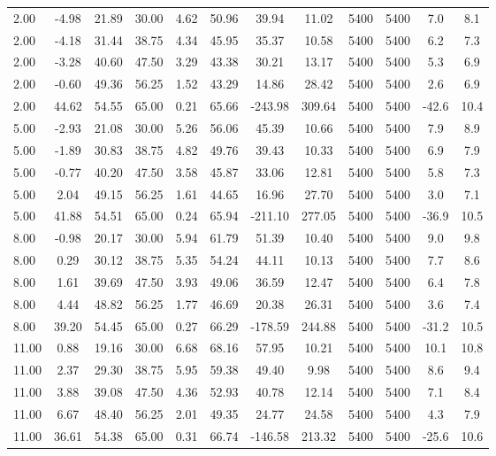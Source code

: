 \documentclass[english]{SPFShortReport}
\begin{document}
\begin{table}[!ht]
\begin{small}
\begin{center}
{\begin{tabular}{l | c c c c c c c c c c c }
2.00 & -4.98 & 21.89 & 30.00 & 4.62 & 50.96 & 39.94 & 11.02 & 5400 & 5400 & 7.0 & 8.1\\ 
2.00 & -4.18 & 31.44 & 38.75 & 4.34 & 45.95 & 35.37 & 10.58 & 5400 & 5400 & 6.2 & 7.3\\ 
2.00 & -3.28 & 40.60 & 47.50 & 3.29 & 43.38 & 30.21 & 13.17 & 5400 & 5400 & 5.3 & 6.9\\ 
2.00 & -0.60 & 49.36 & 56.25 & 1.52 & 43.29 & 14.86 & 28.42 & 5400 & 5400 & 2.6 & 6.9\\ 
2.00 & 44.62 & 54.55 & 65.00 & 0.21 & 65.66 & -243.98 & 309.64 & 5400 & 5400 & -42.6 & 10.4\\ 
5.00 & -2.93 & 21.08 & 30.00 & 5.26 & 56.06 & 45.39 & 10.66 & 5400 & 5400 & 7.9 & 8.9\\ 
5.00 & -1.89 & 30.83 & 38.75 & 4.82 & 49.76 & 39.43 & 10.33 & 5400 & 5400 & 6.9 & 7.9\\ 
5.00 & -0.77 & 40.20 & 47.50 & 3.58 & 45.87 & 33.06 & 12.81 & 5400 & 5400 & 5.8 & 7.3\\ 
5.00 & 2.04 & 49.15 & 56.25 & 1.61 & 44.65 & 16.96 & 27.70 & 5400 & 5400 & 3.0 & 7.1\\ 
5.00 & 41.88 & 54.51 & 65.00 & 0.24 & 65.94 & -211.10 & 277.05 & 5400 & 5400 & -36.9 & 10.5\\ 
8.00 & -0.98 & 20.17 & 30.00 & 5.94 & 61.79 & 51.39 & 10.40 & 5400 & 5400 & 9.0 & 9.8\\ 
8.00 & 0.29 & 30.12 & 38.75 & 5.35 & 54.24 & 44.11 & 10.13 & 5400 & 5400 & 7.7 & 8.6\\ 
8.00 & 1.61 & 39.69 & 47.50 & 3.93 & 49.06 & 36.59 & 12.47 & 5400 & 5400 & 6.4 & 7.8\\ 
8.00 & 4.44 & 48.82 & 56.25 & 1.77 & 46.69 & 20.38 & 26.31 & 5400 & 5400 & 3.6 & 7.4\\ 
8.00 & 39.20 & 54.45 & 65.00 & 0.27 & 66.29 & -178.59 & 244.88 & 5400 & 5400 & -31.2 & 10.5\\ 
11.00 & 0.88 & 19.16 & 30.00 & 6.68 & 68.16 & 57.95 & 10.21 & 5400 & 5400 & 10.1 & 10.8\\ 
11.00 & 2.37 & 29.30 & 38.75 & 5.95 & 59.38 & 49.40 & 9.98 & 5400 & 5400 & 8.6 & 9.4\\ 
11.00 & 3.88 & 39.08 & 47.50 & 4.36 & 52.93 & 40.78 & 12.14 & 5400 & 5400 & 7.1 & 8.4\\ 
11.00 & 6.67 & 48.40 & 56.25 & 2.01 & 49.35 & 24.77 & 24.58 & 5400 & 5400 & 4.3 & 7.9\\ 
11.00 & 36.61 & 54.38 & 65.00 & 0.31 & 66.74 & -146.58 & 213.32 & 5400 & 5400 & -25.6 & 10.6\\ 

\end{tabular}}
\end{center}
\end{small}
\end{table}
\end{document}
